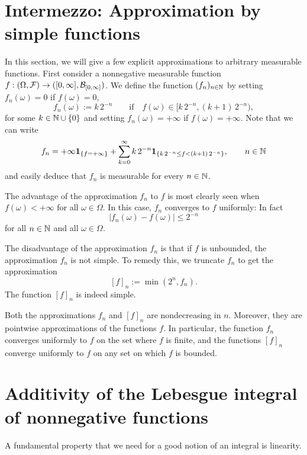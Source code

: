 \section{Intermezzo: Approximation by simple functions}
\label{sec:simple-approximation}

In this section, we will give a few explicit approximations to arbitrary measurable functions. 
First consider a nonnegative measurable function $f : (\Omega, \mathcal F) \to ([0,\infty], \mathcal B_{[0,\infty]})$. We define the function $(f_n)_{n\in\mathbb N}$ by setting $f_n(\omega) = 0$ if $f(\omega) = 0$,
\[
	f_n(\omega) := k\, 2^{-n}\qquad \text{if}\quad f(\omega)\in [k\,2^{-n},(k+1)\,2^{-n}),
\]
for some $k \in \mathbb N\cup\{0\}$ and setting $f_n(\omega) = +\infty$ if $f(\omega) = +\infty$. Note that we can write
\[
	f_n = +\infty \mathbf{1}_{\{f=+\infty\}} + \sum_{k=0}^\infty k\, 2^{-n} \mathbf{1}_{\{k\,2^{-n}\le f < (k+1)\,2^{-n}\}} ,\qquad n\in\mathbb N
\]
and easily deduce that $f_n$ is measurable for every $n\in\mathbb N$.

The advantage of the approximation $f_n$ to $f$ is most clearly seen when $f(\omega) < +\infty$ for all $\omega \in \Omega$. In this case, $f_n$ converges to $f$ uniformly: In fact
\[
|f_n(\omega) - f(\omega)| \leq 2^{-n}
\]
for all $n \in \mathbb N$ and all $\omega \in \Omega$.

The disadvantage of the approximation $f_n$ is that if $f$ is unbounded, the approximation $f_n$ is not simple. To remedy this, we truncate $f_n$ to get the approximation
\[
	[f]_n := \min( 2^n, f_n ).
\]
The function $[f]_n$ is indeed simple.

Both the approximations $f_n$ and $[f]_n$ are nondecreasing in $n$. Moreover, they are pointwise approximations of the functions $f$. In particular, the function $f_n$ converges uniformly to $f$ on the set where $f$ is finite, and the functions $[f]_n$ converge uniformly to $f$ on any set on which $f$ is bounded.


\section{Additivity of the Lebesgue integral of nonnegative functions}

A fundamental property that we need for a good notion of an integral is linearity.

